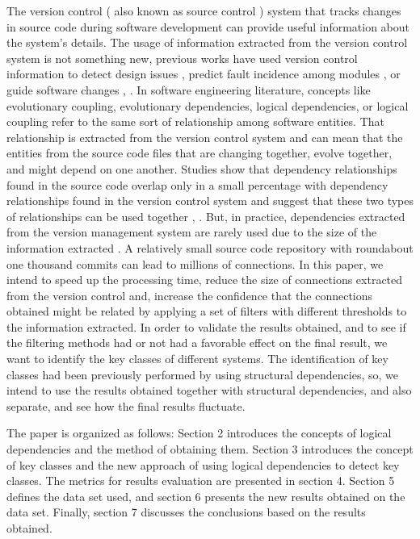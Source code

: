 \documentclass[runningheads]{comsis2}
\begin{document}
The version control ( also known as source control ) system that tracks changes in source code during software development can provide useful information about the system's details. 
The usage of information extracted from the version control system is not something new, previous works have used version control information to detect design issues \cite{Zimmermann:2004:MVH:998675.999460}, predict fault incidence among modules \cite{Predictingfaultincidence}, \cite{Cataldo2009SoftwareDW} or guide software changes \cite{4815274}, \cite{DBLP:journals/ese/AjienkaCC18}.
In software engineering literature, concepts like evolutionary coupling, evolutionary dependencies, logical dependencies, or logical coupling refer to the same sort of relationship among software entities. That relationship is extracted from the version control system and can mean that the entities from the source code files that are changing together, evolve together, and might depend on one another. Studies show that dependency relationships found in the source code overlap only in a small percentage with dependency relationships found in the version control system and suggest that these two types of relationships can be used together \cite{Oliva:2011:ISL:2067853.2068086}, \cite{DBLP:journals/jss/AjienkaC17}. But, in practice, dependencies extracted from the version management system are rarely used due to the size of the information extracted \cite{Shtern:2012:CMS:2332427.2332428}. A relatively small source code repository with roundabout one thousand commits can lead to millions of connections. 
In this paper, we intend to speed up the processing time, reduce the size of connections extracted from the version control and, increase the confidence that the connections obtained might be related by applying a set of filters with different thresholds to the information extracted. 
In order to validate the results obtained, and to see if the filtering methods had or not had a favorable effect on the final result, we want to identify the key classes of different systems. The identification of key classes had been previously performed by using structural dependencies, so,
we intend to use the results obtained together with structural dependencies, and also separate, and see how the final results fluctuate.

The paper is organized as follows: Section 2 introduces the concepts of logical dependencies and the method of obtaining them. Section 3 introduces the concept of key classes and the new approach of using logical dependencies to detect key classes. The metrics for results evaluation are presented in section 4. Section 5 defines the data set used, and section 6 presents the new results obtained on the data set. Finally, section 7 discusses the conclusions based on the results obtained. 
\end{document}
